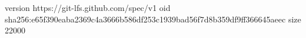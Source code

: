 version https://git-lfs.github.com/spec/v1
oid sha256:e65f390eaba2369c4a3666b586df253c1939bad56f7d8b359df9ff366645aeec
size 22000
